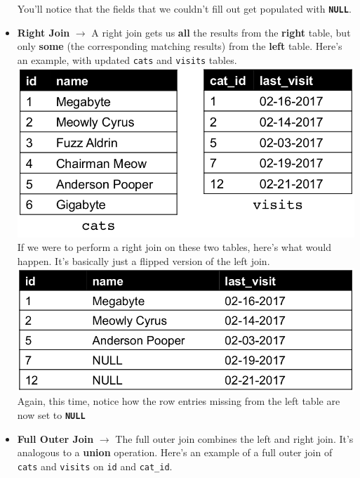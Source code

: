 \documentclass[english, 10pt]{article}
\begin{document}
\begin{itemize}
	You'll notice that the fields that we couldn't fill out get populated with \textbf{\texttt{NULL}}.
	
	\item \textbf{Right Join} $\rightarrow$ A right join gets us \textbf{all} the results from the \textbf{right} table, but only \textbf{some} (the corresponding matching results) from the \textbf{left} table. Here's an example, with updated \texttt{cats} and \texttt{visits} tables.\\
	
	\includegraphics[scale=0.35]{img/table_6.png}\\
	
	If we were to perform a right join on these two tables, here's what would happen. It's basically just a flipped version of the left join.\\
	
	\includegraphics[scale=0.35]{img/table_7.png}\\
	
	Again, this time, notice how the row entries missing from the left table are now set to \texttt{\textbf{NULL}}
	
	\item \textbf{Full Outer Join} $\rightarrow$ The full outer join combines the left and right join. It's analogous to a \textbf{union} operation. Here's an example of a full outer join of \texttt{cats} and \texttt{visits} on \texttt{id} and \texttt{cat\_id}.\\
	

\end{itemize}
\end{document}
